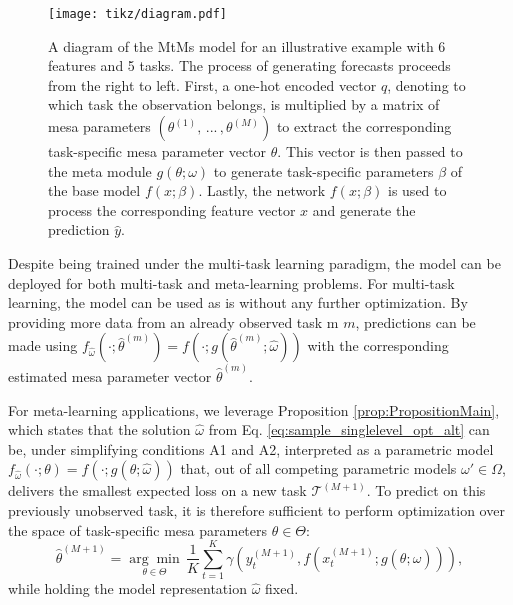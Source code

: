 \documentclass[3p,times,twocolumn]{elsarticle}
\begin{document}
\begin{figure*}[!htbp]
    \centering
    \texttt{[image: tikz/diagram.pdf]}
    \caption{
        A diagram of the MtMs model for an illustrative example with 6 features and 5 tasks.
        The process of generating forecasts proceeds from the right to left. 
        First, a one-hot encoded vector $q$, denoting to which task the observation belongs, is multiplied by a matrix of mesa parameters $(\theta^{(1)},\,...\,,\theta^{(M)})$ to extract the corresponding task-specific mesa parameter vector $\theta$.
        This vector is then passed to the meta module $g(\theta; \omega)$ to generate task-specific parameters $\beta$ of the base model $f(x;\beta)$.
        Lastly, the network $f(x;\beta)$ is used to process the corresponding feature vector $x$ and generate the prediction $\hat{y}$.
    }
    \label{fig:Diagram}
\end{figure*}

Despite being trained under the multi-task learning paradigm, the model can be deployed for both multi-task and meta-learning problems.
For multi-task learning, the model can be used as is without any further optimization.
By providing more data from an already observed task m $m$, predictions can be made using $f_{\hat{\omega}}(\cdot;\hat{\theta}^{(m)})=f(\cdot;g(\hat{\theta}^{(m)};\hat{\omega}))$ with the corresponding estimated mesa parameter vector $\hat{\theta}^{(m)}$.

For meta-learning applications, we leverage Proposition \ref{prop:PropositionMain}, which states that the solution $\hat{\omega}$ from Eq. \ref{eq:sample_singlelevel_opt_alt} can be, under simplifying conditions A1 and A2, interpreted as a parametric model $f_{\hat{\omega}}(\cdot;\theta)=f(\cdot;g(\theta;\hat{\omega}))$ that, out of all competing parametric models $\omega' \in \Omega$, delivers the smallest expected loss on a new task $\mathcal{T}^{(M+1)}$.
To predict on this previously unobserved task, it is therefore sufficient to perform optimization over the space of task-specific mesa parameters $\theta \in \Theta$:
\begin{equation}
    \hat{\theta}^{(M+1)} =  \underset{\theta \in \Theta}{\arg\min} \,\dfrac{1}{K}\sum_{t=1}^{K} \gamma( y_{t}^{(M+1)}, f(x_{t}^{(M+1)};g(\theta;\hat{\omega}))),
\end{equation}
while holding the model representation $\hat{\omega}$ fixed.
\end{document}
